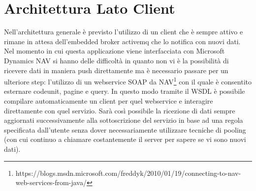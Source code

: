 \section{Architettura Lato Client}
Nell’architettura generale è previsto l’utilizzo di un client che è sempre attivo e rimane in attesa dell’embedded broker activemq che lo notifica con nuovi dati. Nel momento in cui questa applicazione viene interfacciata con Microsoft Dynamics NAV si hanno delle difficoltà in quanto non vi è la possibilità di ricevere dati in maniera push direttamente ma è necessario passare per un ulteriore step: l’utilizzo di un webservice SOAP da NAV\footnote{https://blogs.msdn.microsoft.com/freddyk/2010/01/19/connecting-to-nav-web-services-from-java/} con il quale è consentito esternare codeunit, pagine e query. In questo modo tramite il WSDL è possibile compilare automaticamente un client per quel webservice e interagire direttamente con quel servizio. Sarà così possibile la ricezione di dati sempre aggiornati successivamente alla sottoscrizione del servizio in base ad una regola specificata dall’utente senza dover necessariamente utilizzare tecniche di pooling (con cui continuo a chiamare costantemente il server per sapere se vi sono nuovi dati).
